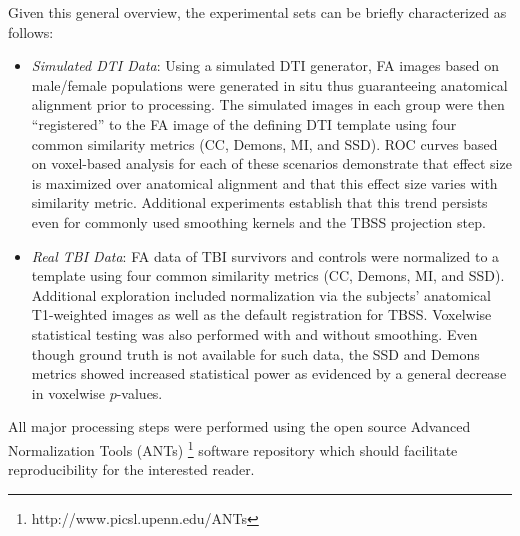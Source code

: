 \documentclass[final,5p,times,twocolumn]{elsarticle}
\begin{document}
Given this general overview, the experimental sets can be briefly
characterized as follows:
\begin{itemize}
  \item {\it Simulated DTI Data}:  Using a simulated DTI generator,
  FA images based on male/female populations were generated in situ
  thus guaranteeing anatomical alignment prior to processing.
  The simulated images in each group were then ``registered'' to the FA image
  of the defining DTI 
  template using four common similarity metrics (CC, Demons, MI, and SSD).  
  ROC curves based on voxel-based analysis for each of these scenarios demonstrate that 
  effect size is maximized over anatomical alignment and that
  this effect size varies with similarity metric.  Additional
  experiments establish that this trend persists even for commonly used smoothing
  kernels and the TBSS projection step.
  \item {\it Real TBI Data}:  FA data of TBI survivors and controls were 
  normalized to a template using four common similarity metrics
  (CC, Demons, MI, and SSD).  Additional exploration included normalization via
  the subjects' anatomical T1-weighted images as well as the default registration for TBSS.
  Voxelwise statistical testing was also performed with
  and without smoothing.  Even though ground truth is not available for such
  data, the SSD and Demons metrics showed increased statistical power as evidenced
  by a general decrease in voxelwise $p$-values.
\end{itemize}
All major processing steps were performed using the open source Advanced Normalization Tools 
(ANTs)%
\footnote{
http://www.picsl.upenn.edu/ANTs
}
software repository which should facilitate reproducibility for the interested 
reader.


\end{document}

